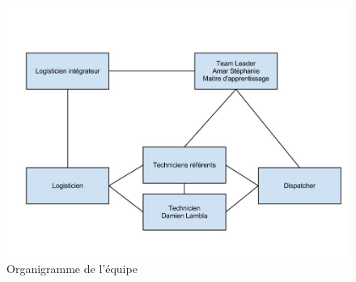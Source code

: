 \paragraph{}
\begin{center}
  \begin{figure}[ht]
    \caption{\label{organigrammeAPX} Organigramme de l'équipe}
    \includegraphics [width=1\textwidth]{images/Organigramme_APX.jpg}
  \end{figure}
\end{center}

